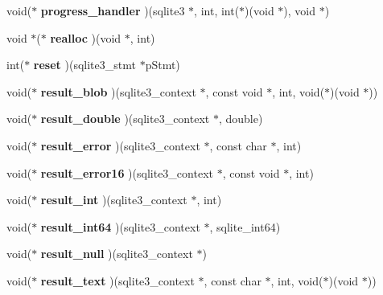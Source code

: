\begin{CompactItemize}
\item 
void($\ast$ \textbf{progress\_\-handler} )(sqlite3 $\ast$, int, int($\ast$)(void $\ast$), void $\ast$)\label{structsqlite3__api__routines_82835ee5de262ba3f2c8eafa8084239a}

\item 
void $\ast$($\ast$ \textbf{realloc} )(void $\ast$, int)\label{structsqlite3__api__routines_a674e9e888b9062d223eac5705593d1f}

\item 
int($\ast$ \textbf{reset} )(sqlite3\_\-stmt $\ast$pStmt)\label{structsqlite3__api__routines_278b50008671f4d2c9fe2cd714914755}

\item 
void($\ast$ \textbf{result\_\-blob} )(sqlite3\_\-context $\ast$, const void $\ast$, int, void($\ast$)(void $\ast$))\label{structsqlite3__api__routines_055f8281c2d07ab170b2b772deb77f1a}

\item 
void($\ast$ \textbf{result\_\-double} )(sqlite3\_\-context $\ast$, double)\label{structsqlite3__api__routines_d732954deb9dda531cd138ce9c706361}

\item 
void($\ast$ \textbf{result\_\-error} )(sqlite3\_\-context $\ast$, const char $\ast$, int)\label{structsqlite3__api__routines_12976ccb8189106083edd7995abe09a3}

\item 
void($\ast$ \textbf{result\_\-error16} )(sqlite3\_\-context $\ast$, const void $\ast$, int)\label{structsqlite3__api__routines_cb9025515faae2d91a3f9b8025430a3c}

\item 
void($\ast$ \textbf{result\_\-int} )(sqlite3\_\-context $\ast$, int)\label{structsqlite3__api__routines_02cb29ba59fa2f6d5767d52824e97f82}

\item 
void($\ast$ \textbf{result\_\-int64} )(sqlite3\_\-context $\ast$, sqlite\_\-int64)\label{structsqlite3__api__routines_780f3d8b790e1786d54918dba4d06429}

\item 
void($\ast$ \textbf{result\_\-null} )(sqlite3\_\-context $\ast$)\label{structsqlite3__api__routines_9019c21bbe68c6f5b50179b2e42e847d}

\item 
void($\ast$ \textbf{result\_\-text} )(sqlite3\_\-context $\ast$, const char $\ast$, int, void($\ast$)(void $\ast$))\label{structsqlite3__api__routines_0db1250dc54d4005762c7a590837fad1}


\end{CompactItemize}
